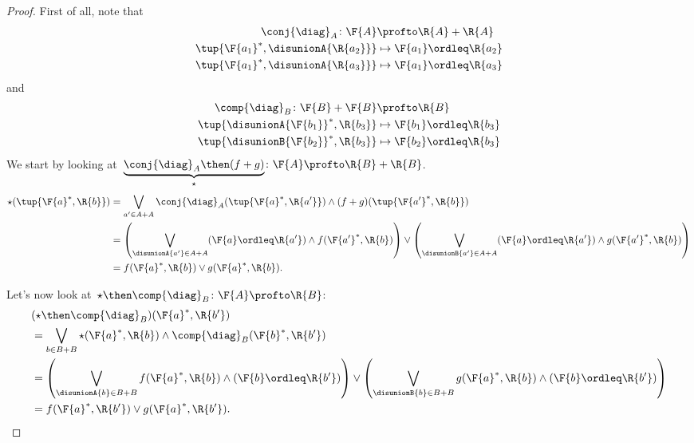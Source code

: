 \begin{proof}
    First of all, note that
    \begin{equation}
        \begin{aligned}
            \conj{\diag}_A\colon \F{A}&\profto \R{A}+\R{A}\\
            \tup{\F{a_1}^*,\disunionA{\R{a_2}}}&\mapsto \F{a_1}\ordleq \R{a_2}\\
            \tup{\F{a_1}^*,\disunionA{\R{a_3}}}&\mapsto \F{a_1}\ordleq \R{a_3}
        \end{aligned}
    \end{equation}
    and
    \begin{equation}
        \begin{aligned}
            \comp{\diag}_B\colon \F{B}+\F{B}&\profto \R{B}\\
            \tup{\disunionA{\F{b_1}}^*,\R{b_3}}&\mapsto \F{b_1}\ordleq \R{b_3}\\
            \tup{\disunionB{\F{b_2}}^*,\R{b_3}}&\mapsto \F{b_2}\ordleq \R{b_3}
        \end{aligned}
    \end{equation}
    We start by looking at~$\underbrace{\conj{\diag}_A\then (f+g)}_{\star}\colon \F{A} \profto \R{B}+\R{B}$.
    \begin{equation}
        \begin{aligned}
            \star (\tup{\F{a}^*,\R{b}})&=\bigvee_{a'\in A+A} \conj{\diag}_A(\tup{\F{a}^*,\R{a'}})\wedge (f+g)(\tup{\F{a'}^*,\R{b}})\\
            &=\left( \bigvee_{\disunionA{a'}\in A+A} (\F{a}\ordleq \R{a'})\wedge f(\F{a'}^*,\R{b}) \right)\vee \left( \bigvee_{\disunionB{a'}\in A+A} (\F{a}\ordleq \R{a'})\wedge g(\F{a'}^*,\R{b}) \right)\\
            &=f(\F{a}^*,\R{b}) \vee g(\F{a}^*,\R{b}).
        \end{aligned}
    \end{equation}

    Let's now look at~$\star \then \comp{\diag}_B\colon \F{A} \profto \R{B}$:
    \begin{equation}
        \begin{aligned}
            &(\star \then \comp{\diag}_B)(\F{a}^*,\R{b'})\\
            &=\bigvee_{b\in B+B} \star(\F{a}^*,\R{b})\wedge \comp{\diag}_B(\F{b}^*,\R{b'}) \\
            &=\left(\bigvee_{\disunionA{b}\in B+B} f(\F{a}^*,\R{b}) \wedge (\F{b}\ordleq \R{b'})\right) \vee
            \left(\bigvee_{\disunionB{b}\in B+B} g(\F{a}^*,\R{b}) \wedge (\F{b}\ordleq \R{b'})\right)\\
            &=f(\F{a}^*,\R{b'})\vee g(\F{a}^*,\R{b'}).
        \end{aligned}
    \end{equation}
\end{proof}

